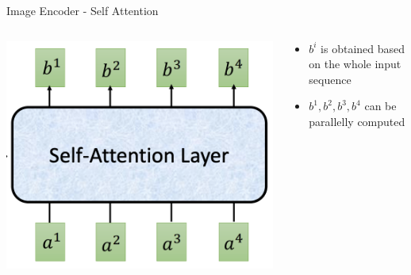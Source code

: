 \documentclass[aspectratio=169,xcolor=dvipsnames]{beamer}
\begin{document}
\begin{frame}{Image Encoder - Self Attention}
    \begin{columns}
        \begin{column}{0.4\textwidth}
        \includegraphics[width=\textwidth]{figures/self_attention.png}
        \end{column}
        \begin{column}{0.6\textwidth}
            \begin{itemize}
                \item $b^i$ is obtained based on the whole input sequence
                \item $b^1,b^2,b^3,b^4$ can be parallelly computed
             \end{itemize}
        \end{column}
    \end{columns}
\end{frame}

\end{document}
